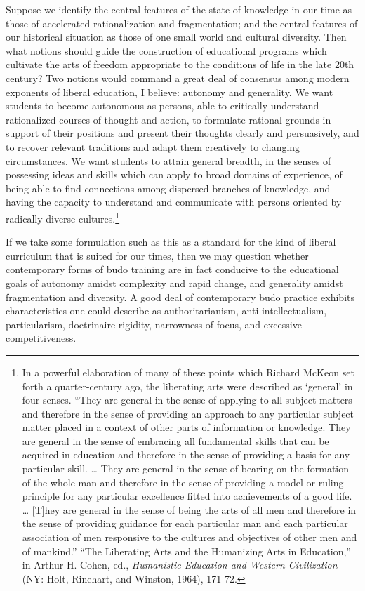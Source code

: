 Suppose we identify the central features of the state of knowledge in our time as those of accelerated rationalization and fragmentation; and the central features of our historical situation as those of one small world and cultural diversity. Then what notions should guide the construction of educational programs which cultivate the arts of freedom appropriate to the conditions of life in the late 20th century? Two notions would command a great deal of consensus among modern exponents of liberal education, I believe: autonomy and generality. We want students to become autonomous as persons, able to critically understand rationalized courses of thought and action, to formulate rational grounds in support of their positions and present their thoughts clearly and persuasively, and to recover relevant traditions and adapt them creatively to changing circumstances. We want students to attain general breadth, in the senses of possessing ideas and skills which can apply to broad domains of experience, of being able to find connections among dispersed branches of knowledge, and having the capacity to understand and communicate with persons oriented by radically diverse cultures.\footnote{In a powerful elaboration of many of these points which Richard McKeon set forth a quarter-century ago, the liberating arts were described as `general' in four senses. ``They are general in the sense of applying to all subject matters and therefore in the sense of providing an approach to any particular subject matter placed in a context of other parts of information or knowledge. They are general in the sense of embracing all fundamental skills that can be acquired in education and therefore in the sense of providing a basis for any particular skill. \ldots{} They are general in the sense of bearing on the formation of the whole man and therefore in the sense of providing a model or ruling principle for any particular excellence fitted into achievements of a good life. \ldots{} [T]hey are general in the sense of being the arts of all men and therefore in the sense of providing guidance for each particular man and each particular association of men responsive to the cultures and objectives of other men and of mankind.'' ``The Liberating Arts and the Humanizing Arts in Education,'' in Arthur H. Cohen, ed., \emph{Humanistic Education and Western Civilization} (NY: Holt, Rinehart, and Winston, 1964), 171-72.}

If we take some formulation such as this as a standard for the kind of liberal curriculum that is suited for our times, then we may question whether contemporary forms of budo training are in fact conducive to the educational goals of autonomy amidst complexity and rapid change, and generality amidst fragmentation and diversity. A good deal of contemporary budo practice exhibits characteristics one could describe as authoritarianism, anti-intellectualism, particularism, doctrinaire rigidity, narrowness of focus, and excessive competitiveness.

